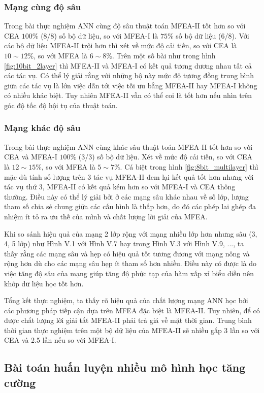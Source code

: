 \subsubsection{Mạng cùng độ sâu}
Trong bài thực nghiệm ANN cùng độ sâu thuật toán MFEA-II tốt hơn so với CEA $100\%$ (8/8) số bộ dữ liệu, so với MFEA-I là $75\%$ số bộ dữ liệu (6/8). Với các bộ dữ liệu MFEA-II trội hơn thì xét về mức độ cải tiến, so với CEA là $10 \sim 12\%$, so với MFEA là $6 \sim 8\%$. Trên một số bài như trong hình \ref{fig:10bit_2layer} thì MFEA-II và MFEA-I có kết quả tương dương nhau tất cả các tác vụ. Có thể lý giải rằng với những bộ này mức độ tương đồng trung bình giữa các tác vụ là lớn việc dẫn tới việc tối ưu bằng MFEA-II hay MFEA-I không có nhiều khác biệt. Tuy nhiên MFEA-II vẫn có thể coi là tốt hơn nếu nhìn trên góc độ tốc độ hội tụ của thuật toán.

\subsubsection{Mạng khác độ sâu}
Trong bài thực nghiệm ANN cùng khác sâu thuật toán MFEA-II tốt hơn so với CEA và MFEA-I $100\%$ (3/3) số bộ dữ liệu. Xét về mức độ cải tiến, so với CEA là $12 \sim 15\%$, so với MFEA là $5 \sim 7\%$. Cá biệt trong hình \ref{fig:8bit_multilayer} thì mặc dù tính số lượng trên 3 tác vụ MFEA-II đem lại kết quả tốt hơn nhưng với tác vụ thứ 3, MFEA-II có kết quả kém hơn so với MFEA-I và CEA thông thường. Điều này có thể lý giải bởi ở các mạng sâu khác nhau về số lớp, lượng tham số chia sẻ chung giữa các cấu hình là thấp hơn, do đó các phép lai ghép đa nhiệm ít tỏ ra ưu thế của mình và chất lượng lời giải của MFEA.

Khi so sánh hiệu quả của mạng 2 lớp rộng với mạng nhiều lớp hơn nhưng sâu (3, 4, 5 lớp) như Hình V.1 với Hình V.7 hay trong Hình V.3 với Hình V.9, ..., ta thấy rằng các mạng sâu và hẹp có hiệu quả tốt tương đương với mạng nông và rộng hơn dù cho các mạng sâu hẹp ít tham số hơn nhiều. Điều này có được là do việc tăng độ sâu của mạng giúp tăng độ phức tạp của hàm xấp xỉ biểu diễn nên khớp dữ liệu học tốt hơn.

Tổng kết thực nghiệm, ta thấy rõ hiệu quả của chất lượng mạng ANN học bởi các phương pháp tiếp cận dựa trên MFEA đặc biệt là MFEA-II. Tuy nhiên, để có được chất lượng lời giải tất MFEA-II phải trả giá về mặt thời gian. Trung bình thời gian thực nghiệm trên một bộ dữ liệu của MFEA-II sẽ nhiều gấp 3 lần so với CEA và 2.5 lần nếu so với MFEA-I.

\subsection{Bài toán huấn luyện nhiều mô hình học tăng cường}

